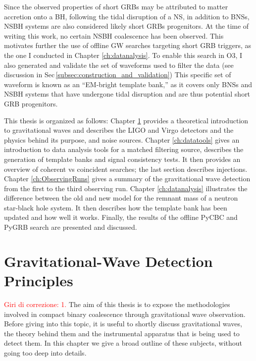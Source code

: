 \documentclass[binding=0.6cm, LaM]{sapthesis}
\newcommand{\fpg}[1]{\textcolor{red}{#1} }
\begin{document}
	Since the observed properties of short GRBs may be attributed to matter accretion onto a BH,
	following the tidal disruption of a NS, in addition to BNSs, NSBH systems are also considered likely short GRBs progenitors.
	At the time of writing this work, no certain NSBH coalescence has been observed.
	This motivates further the use of 
	offline GW searches targeting short GRB triggers, as the one I conducted in Chapter \ref{ch:datanalysis}.
	To enable this search in O3, I also generated and validate the set of waveforms used to filter the data (see discussion in Sec\,\ref{subsec:construction_and_validation})
	This specific set of waveform is known as an ``EM-bright template bank,'' 
	as it covers only BNSs and NSBH systems that have undergone tidal disruption and are thus potential short GRB progenitors.

	This thesis is organized as follows: Chapter \ref{ch:GWDetectionPrinciples} provides a theoretical introduction to gravitational waves and 
	describes the LIGO and Virgo detectors and the physics behind its purpose, and noise sources.
	Chapter \ref{ch:datatools} gives an introduction to data analysis tools for a matched filtering source, 
	describes the generation of template banks and signal consistency tests.
	It then provides an overview of coherent vs coincident searches; the last section describes injections.
	Chapter \ref{ch:ObservingRuns} gives a summary of the gravitational wave detection from the first to the third observing run.
	Chapter \ref{ch:datanalysis} illustrates the difference between the old and new model for the remnant mass of a neutron star-black hole system.
	It then describes how the template bank has been updated and how well it works.
	Finally, the results of the offline {\ttfamily PyCBC} and {\ttfamily PyGRB} search are presented and discussed.

\chapter{Gravitational-Wave Detection Principles}
\label{ch:GWDetectionPrinciples}
\fpg{Giri di correzione: 1.}%
	The aim of this thesis is to expose the methodologies involved 
	in compact binary coalescence through gravitational wave observation. 
	Before giving into this topic, it is useful to shortly discuss gravitational waves, 
	the theory behind them and the instrumental apparatus that is being used to detect them. 
	In this chapter we give a broad outline of these subjects, 
	without going too deep into details.
\end{document}

